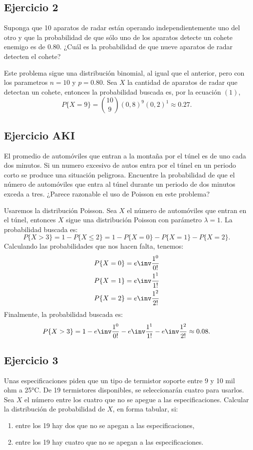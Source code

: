 \subsection*{Ejercicio 2}
	Suponga que 10 aparatos de radar están operando independientemente uno del otro y que la probabilidad
	de que sólo uno de los aparatos detecte un cohete enemigo es de 0.80. ¿Cuál es la probabilidad de que nueve
	aparatos de radar detecten el cohete?

\begin{sol}
	Este problema sigue una distribución binomial, al igual que el anterior, pero con los parametros $n=10$ y $p=0.80$. Sea $X$ la cantidad de aparatos de radar que detectan un cohete, entonces la probabilidad buscada es, por la ecuación $(1)$,
	\[ P\{X=9\} = \binom{10}{9}(0,8)^9(0,2)^1 \approx 0.27. \]
\end{sol}
\subsection*{Ejercicio AKI}
	El promedio de automóviles que entran a la montaña por el túnel es de uno cada dos minutos. Si un
	numero excesivo de autos entra por el túnel en un periodo corto se produce una situación peligrosa. Encuentre la
	probabilidad de que el número de automóviles que entra al túnel durante un periodo de dos minutos exceda a tres.
	¿Parece razonable el uso de Poisson en este problema?

\begin{sol}
	Usaremos la distribución Poisson. Sea $X$ el número de automóviles que entran en el túnel, entonces $X$ sigue una distribución Poisson con parámetro $\lambda=1$. La probabilidad buscada es:
	\[ P\{X>3\} = 1 - P\{X\leq 2\} = 1 -  P\{X=0\} -P\{X=1\}-P\{X=2\}. \]
	Calculando las probabilidades que nos hacen falta, tenemos:
	\begin{align*}
		P\{X=0\} &= e\inv \frac{1^0}{0!} \\
		P\{X=1\} &= e\inv \frac{1^1}{1!} \\
		P\{X=2\} &= e\inv \frac{1^2}{2!} 
	\end{align*}	
	Finalmente, la probabilidad buscada es:
	\[ P\{X>3\} = 1 -  e\inv \frac{1^0}{0!} - e\inv \frac{1^1}{1!} - e\inv \frac{1^2}{2!} \approx 0.08. \]
\end{sol}
\subsection*{Ejercicio 3}
	Unas especificaciones piden que un tipo de termistor soporte entre 9 y 10 mil ohm a 25°C. De 19
	termistores disponibles, se seleccionarán cuatro para usarlos. Sea $X$ el número entre los cuatro que no se apegue
	a las especificaciones. Calcular la distribución de probabilidad de $X$, en forma tabular, si:
	\begin{enumerate}
		\item entre los 19 hay dos que no se apegan a las especificaciones,
		\item entre los 19 hay cuatro que no se apegan a las especificaciones.
	\end{enumerate}

